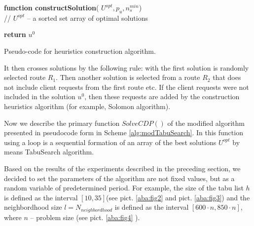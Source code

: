 \documentclass[]{TAACpaper}
\begin{document}
\begin{algorithm}[H]

	\textbf{function constructSolution}( $U^{opt}, p_u, n^{min}_s$) \\
	// $U^{opt}$ -- a sorted set array of optimal solutions \\
	
	
	
	
	
	\textbf{return} $u^0$
	
	\caption{Pseudo-code for heuristics construction algorithm.}
	\label{alg:constructSolution}
\end{algorithm}

It then crosses solutions by the following rule: with the first solution is randomly selected route $R_1$. Then another solution is selected from a route $R_2$ that does not include client requests from the first  route etc. If the client requests were not included in the solution $u^0$, then these requests are added by the construction heuristics algorithm (for example, Solomon algorithm).


Now we describe the primary function $SolveCDP()$ of the modified algorithm presented in pseudocode form in Scheme \ref{alg:modTabuSearch}. In this function using a loop is a sequential formation of an array of the best solutions $U^{opt}$ by means TabuSearch algorithm.   

Based on the results of the experiments described in the preceding section, we decided to set the parameters of the algorithm are not fixed values, but as a random variable of predetermined period. For example, the size of the tabu list $h$ is defined as the interval $[10,35]$(see pict. \ref{aba:fig2} and  pict. \ref{aba:fig3}) and the neighbordhood size $l=N_{neighbordhood}$ is defined as the interval $[600\cdot n,850\cdot n]$, where $n$ -- problem size (see pict. \ref{aba:fig4} ).
\end{document}
